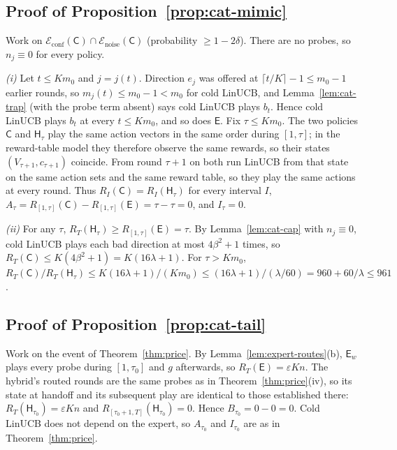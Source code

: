 \documentclass[anon]{alt2027} %
\providecommand{\qed}{\hfill\jmlrBlackBox}
\newcommand{\eps}{\varepsilon}
\newcommand{\Cold}{\mathsf{C}}
\newcommand{\Exp}{\mathsf{E}}
\newcommand{\Hyb}{\mathsf{H}}
\begin{document}
\subsection{Proof of Proposition~\ref{prop:cat-mimic}}

Work on $\mathcal E_{\mathrm{conf}}(\Cold)\cap\mathcal E_{\mathrm{noise}}(\Cold)$
(probability $\ge1-2\delta$). There are no probes, so $n_j\equiv0$ for every
policy.

\emph{(i)} Let $t\le Km_0$ and $j=j(t)$. Direction $e_j$ was offered at
$\lceil t/K\rceil-1\le m_0-1$ earlier rounds, so $m_j(t)\le m_0-1<m_0$ for cold
LinUCB, and Lemma~\ref{lem:cat-trap} (with the probe term absent) says cold
LinUCB plays $b_t$. Hence cold LinUCB plays $b_t$ at every $t\le Km_0$, and
so does $\Exp$. Fix $\tau\le Km_0$. The two policies $\Cold$ and $\Hyb_\tau$
play the same action vectors in the same order during $[1,\tau]$; in the
reward-table model they therefore observe the same rewards, so their states
$(V_{\tau+1},c_{\tau+1})$ coincide. From round $\tau+1$ on both run LinUCB
from that state on the same action sets and the same reward table, so they
play the same actions at every round. Thus $R_I(\Cold)=R_I(\Hyb_\tau)$ for every
interval $I$, $A_\tau=R_{[1,\tau]}(\Cold)-R_{[1,\tau]}(\Exp)=\tau-\tau=0$, and $I_\tau=0$.

\emph{(ii)} For any $\tau$, $R_T(\Hyb_\tau)\ge R_{[1,\tau]}(\Exp)=\tau$. By
Lemma~\ref{lem:cat-cap} with $n_j\equiv0$, cold LinUCB plays each bad
direction at most $4\beta^2+1$ times, so $R_T(\Cold)\le K(4\beta^2+1)=K(16\lambda+1)$.
For $\tau>Km_0$, $R_T(\Cold)/R_T(\Hyb_\tau)\le K(16\lambda+1)/(Km_0)\le(16\lambda+1)/(\lambda/60)=960+60/\lambda\le961$. \qed

\subsection{Proof of Proposition~\ref{prop:cat-tail}}

Work on the event of Theorem~\ref{thm:price}. By Lemma~\ref{lem:expert-routes}(b),
$\Exp_w$ plays every probe during $[1,\tau_0]$ and $g$ afterwards, so
$R_T(\Exp)=\eps Kn$. The hybrid's routed rounds are the same probes as in
Theorem~\ref{thm:price}(iv), so its state at handoff and its subsequent play
are identical to those established there: $R_T(\Hyb_{\tau_0})=\eps Kn$ and
$R_{[\tau_0+1,T]}(\Hyb_{\tau_0})=0$. Hence $B_{\tau_0}=0-0=0$. Cold LinUCB does not
depend on the expert, so $A_{\tau_0}$ and $I_{\tau_0}$ are as in
Theorem~\ref{thm:price}. \qed
\end{document}
